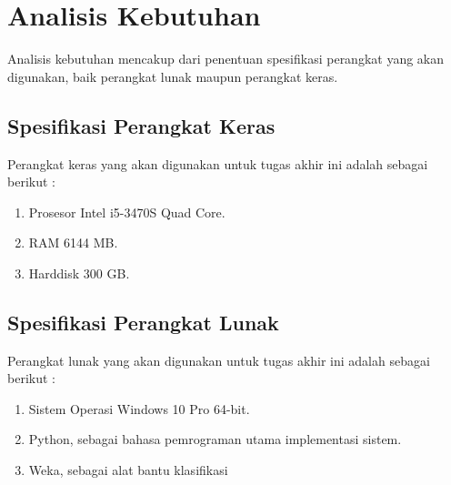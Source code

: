 \documentclass[../Proposal.tex]{subfiles}
\begin{document}
	\section{Analisis Kebutuhan}
	Analisis kebutuhan mencakup dari penentuan spesifikasi perangkat yang akan digunakan, baik perangkat lunak maupun perangkat keras.
	
		\subsection{Spesifikasi Perangkat Keras}
		Perangkat keras yang akan digunakan untuk tugas akhir ini adalah sebagai berikut : 
		\begin{enumerate}
			\item Prosesor Intel i5-3470S Quad Core.
			\item RAM 6144 MB.
			\item Harddisk 300 GB.
		\end{enumerate}
		
		\subsection{Spesifikasi Perangkat Lunak}
		Perangkat lunak yang akan digunakan untuk tugas akhir ini adalah sebagai berikut : 
		\begin{enumerate}
			\item Sistem Operasi Windows 10 Pro 64-bit.
			\item Python, sebagai bahasa pemrograman utama implementasi sistem.
			\item Weka, sebagai alat bantu klasifikasi
		\end{enumerate}
\end{document}
